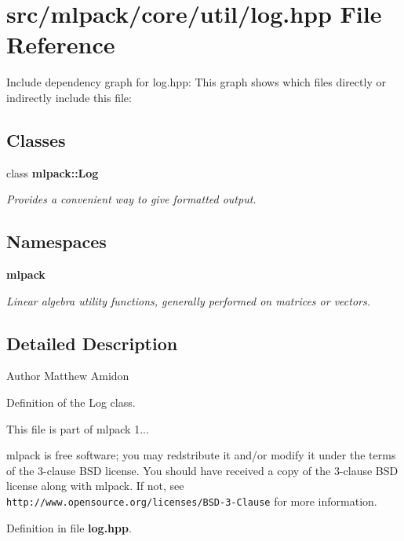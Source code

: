 \section{src/mlpack/core/util/log.hpp File Reference}
\label{log_8hpp}
Include dependency graph for log.\-hpp\-:
This graph shows which files directly or indirectly include this file\-:
\subsection*{Classes}
\begin{DoxyCompactItemize}
\item 
class {\bf mlpack\-::\-Log}
\begin{DoxyCompactList}\small\item\em Provides a convenient way to give formatted output. \end{DoxyCompactList}\end{DoxyCompactItemize}
\subsection*{Namespaces}
\begin{DoxyCompactItemize}
\item 
{\bf mlpack}
\begin{DoxyCompactList}\small\item\em Linear algebra utility functions, generally performed on matrices or vectors. \end{DoxyCompactList}\end{DoxyCompactItemize}


\subsection{Detailed Description}
\begin{DoxyAuthor}{Author}
Matthew Amidon
\end{DoxyAuthor}
Definition of the Log class.

This file is part of mlpack 1...

mlpack is free software; you may redstribute it and/or modify it under the terms of the 3-\/clause B\-S\-D license. You should have received a copy of the 3-\/clause B\-S\-D license along with mlpack. If not, see {\tt http\-://www.\-opensource.\-org/licenses/\-B\-S\-D-\/3-\/\-Clause} for more information. 

Definition in file {\bf log.\-hpp}.

